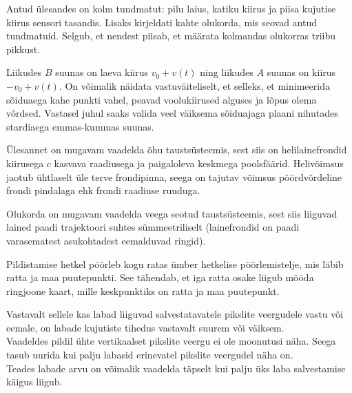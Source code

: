 \documentclass[10pt]{article}
\begin{document}
{
\hint
Antud ülesandes on kolm tundmatut: pilu laius, katiku kiirus ja piisa kujutise kiirus sensori tasandis. Lisaks kirjeldati kahte olukorda, mis seovad antud tundmatuid. Selgub, et nendest piisab, et määrata kolmandas olukorras triibu pikkust.
\probend
\bigskip


\hint
Liikudes $B$ suunas on laeva kiirus $v_0 + v(t)$ ning liikudes $A$ suunas on kiirus $-v_0 + v(t)$. On võimalik näidata vastuväiteliselt, et selleks, et minimeerida sõiduaega kahe punkti vahel, peavad voolukiirused alguses ja lõpus olema võrdsed. Vastasel juhul saaks valida veel väiksema sõiduajaga plaani nihutades stardiaega emmas-kummas suunas.
\probend
\bigskip


\hint
Ülesannet on mugavam vaadelda õhu taustsüsteemis, sest siis on helilainefrondid kiirusega $c$ kasvava raadiusega ja paigaloleva keskmega poolsfäärid. Helivõimsus jaotub ühtlaselt üle terve frondipinna, seega on tajutav võimsus pöördvõrdeline frondi pindalaga ehk frondi raadiuse ruuduga.
\probend
\bigskip


\hint
Olukorda on mugavam vaadelda veega seotud taustsüsteemis, sest siis liiguvad lained paadi trajektoori suhtes sümmeetriliselt (lainefrondid on paadi varasematest asukohtadest eemalduvad ringid).
\probend
\bigskip


\hint
Pildistamise hetkel pöörleb kogu ratas ümber hetkelise pöörlemistelje, mis läbib
ratta ja maa puutepunkti. See tähendab, et iga ratta osake liigub mööda ringjoone kaart, mille keskpunktiks on ratta ja maa puutepunkt.
\probend
\bigskip


\hint
\osa
Vastavalt sellele kas labad liiguvad salvestatavatele pikslite veergudele vastu või eemale, on labade kujutiste tihedus vastavalt suurem või väiksem.\\
\osa
Vaadeldes pildil ühte vertikaalset pikslite veergu ei ole moonutusi näha. Seega tasub uurida kui palju labasid erinevatel pikslite veergudel näha on.\\
\osa
Teades labade arvu on võimalik vaadelda täpselt kui palju üks laba salvestamise käigus liigub.
\probend
\bigskip

}
\end{document}

